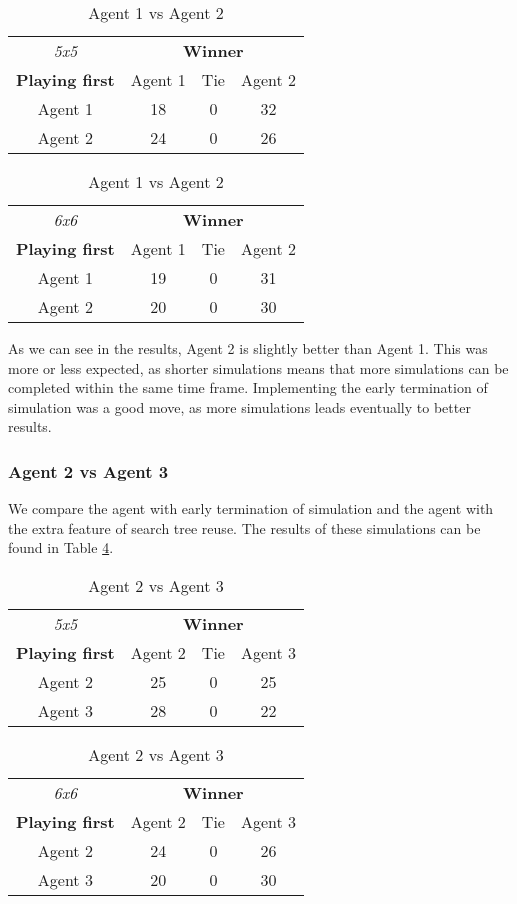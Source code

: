 \begin{table}[!h]
	\centering
	\begin{tabular}{c | c | c | c}
		\textit{5x5} & \multicolumn{3}{c}{\textbf{Winner}}        \\
		\textbf{Playing first} & Agent 1 & Tie & Agent 2 \\ \hline
		Agent 1 & 18 & 0 & 32 \\ \hline
		Agent 2 & 24 & 0 & 26
	\end{tabular}
	\quad
	\begin{tabular}{c | c | c | c}
		\textit{6x6} & \multicolumn{3}{c}{\textbf{Winner}}        \\
		\textbf{Playing first} & Agent 1 & Tie & Agent 2 \\ \hline
		Agent 1 & 19 & 0 & 31 \\ \hline
		Agent 2 & 20 & 0 & 30
	\end{tabular}
	\caption{\label{result:Ag1vsAg2}Agent 1 vs Agent 2}
\end{table}

As we can see in the results, Agent 2 is slightly better than Agent 1. This was more or less expected, as shorter simulations means that more simulations can be completed within the same time frame. Implementing the early termination of simulation was a good move, as more simulations leads eventually to better results.

\subsubsection{Agent 2 vs Agent 3}
We compare the agent with early termination of simulation and the agent with the extra feature of search tree reuse. The results of these simulations can be found in Table \ref{result:Ag2vsAg3}.

\begin{table}[!h]
	\centering
	\begin{tabular}{c | c | c | c}
		\textit{5x5} & \multicolumn{3}{c}{\textbf{Winner}}        \\
		\textbf{Playing first} & Agent 2 & Tie & Agent 3 \\ \hline
		Agent 2 & 25 & 0 & 25 \\ \hline
		Agent 3 & 28 & 0 & 22
	\end{tabular}
	\quad
	\begin{tabular}{c | c | c | c}
		\textit{6x6} & \multicolumn{3}{c}{\textbf{Winner}}        \\
		\textbf{Playing first} & Agent 2 & Tie & Agent 3 \\ \hline
		Agent 2 & 24 & 0 & 26 \\ \hline
		Agent 3 & 20 & 0 & 30
	\end{tabular}
	\caption{\label{result:Ag2vsAg3}Agent 2 vs Agent 3}
\end{table}

